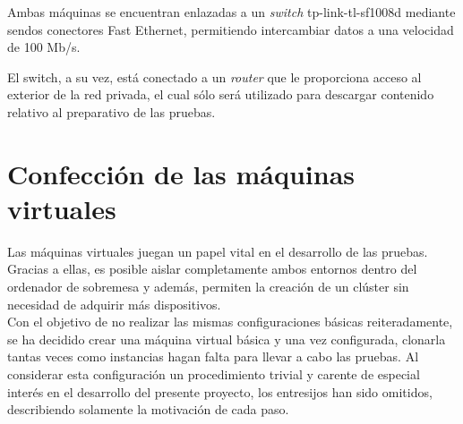 Ambas máquinas se encuentran enlazadas a un \textit{switch} tp-link-tl-sf1008d mediante sendos conectores Fast Ethernet, permitiendo intercambiar datos a una velocidad de 100 Mb/s.

El switch,  a su vez, está conectado a un \textit{router} que le proporciona acceso al exterior de la red privada, el cual sólo será utilizado para descargar contenido relativo al preparativo de las pruebas.\\ 

\section{Confección de las máquinas virtuales}

Las máquinas virtuales juegan un papel vital en el desarrollo de las pruebas. Gracias a ellas, es posible aislar completamente ambos entornos dentro del ordenador de sobremesa y además, permiten la creación de un clúster sin necesidad de adquirir más dispositivos.\\
 
Con el objetivo de no realizar las mismas configuraciones básicas reiteradamente, se ha decidido crear una máquina virtual básica y una vez configurada, clonarla tantas veces como instancias hagan falta para llevar a cabo las pruebas. Al considerar esta configuración un procedimiento trivial y carente de especial interés en el desarrollo del presente proyecto, los entresijos han sido omitidos, describiendo solamente la motivación de cada paso.\\

